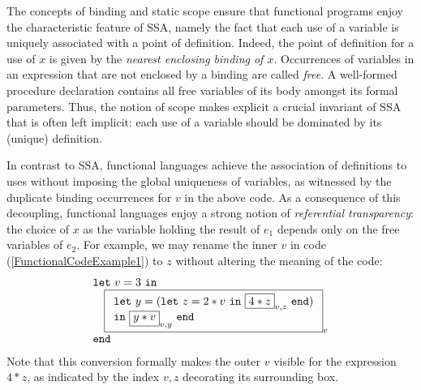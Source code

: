 The concepts of binding and static scope ensure that functional
programs enjoy the characteristic feature of SSA, namely the fact that
each use of a variable is uniquely associated with a point of
definition. Indeed, the point of definition for a use of $x$ is given
by the \emph{nearest enclosing binding of $x$}. Occurrences of
variables in an expression that are not enclosed by a binding are
called \emph{free}. A well-formed procedure declaration contains all
free variables of its body amongst its formal parameters.  Thus, the
notion of scope makes explicit a crucial invariant of SSA that is
often left implicit: each use of a variable should be dominated by its
(unique) definition.

In contrast to SSA, functional languages achieve the association of
definitions to uses without imposing the global uniqueness of
variables, as witnessed by the duplicate binding occurrences for $v$
in the above code. As a consequence of this decoupling, functional
languages enjoy a strong notion of \emph{referential transparency}:
the choice of $x$ as the variable holding the result of $e_1$ depends
only on the free variables of $e_2$. For example, we may rename the
inner $v$ in code (\ref{FunctionalCodeExample1}) to $z$ without
altering the meaning of the code:
\begin{equation}
\label{FunctionalCodeExample2}
\begin{array}{l}
\mathtt{let}\ v = 3\ \mathtt{in}\\
\quad 
  \fbox{$
   \begin{array}[t]{l} 
    \mathtt{let}\ y = (\mathtt{let}\ z=2*v \ \mathtt{in}\ \fbox{$4*z$}_{v,z}\ \mathtt{end})\\
    \mathtt{in}\ \fbox{$y*v$}_{v,y}\ \mathtt{end}\\
\end{array}$}_v\\
\mathtt{end}
\end{array}
\end{equation}
Note that this conversion formally makes the outer $v$ visible for the
expression $4*z$, as indicated by the index $v,z$ decorating its
surrounding box.

